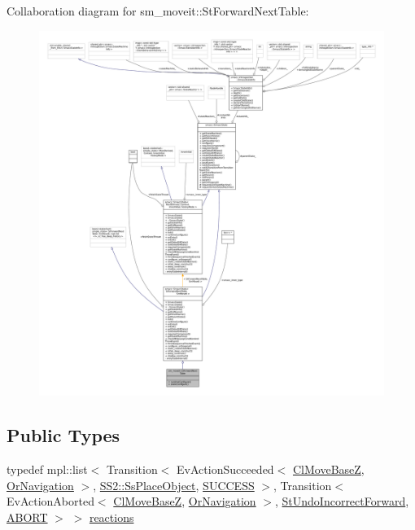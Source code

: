 Collaboration diagram for sm\+\_\+moveit\+:\+:St\+Forward\+Next\+Table\+:
\nopagebreak
\begin{figure}[H]
\begin{center}
\leavevmode
\includegraphics[width=350pt]{structsm__moveit_1_1StForwardNextTable__coll__graph}
\end{center}
\end{figure}
\subsection*{Public Types}
\begin{DoxyCompactItemize}
\item 
typedef mpl\+::list$<$ Transition$<$ Ev\+Action\+Succeeded$<$ \hyperlink{classcl__move__base__z_1_1ClMoveBaseZ}{Cl\+Move\+BaseZ}, \hyperlink{classsm__moveit_1_1OrNavigation}{Or\+Navigation} $>$, \hyperlink{structsm__moveit_1_1SS2_1_1SsPlaceObject}{S\+S2\+::\+Ss\+Place\+Object}, \hyperlink{classSUCCESS}{S\+U\+C\+C\+E\+SS} $>$, Transition$<$ Ev\+Action\+Aborted$<$ \hyperlink{classcl__move__base__z_1_1ClMoveBaseZ}{Cl\+Move\+BaseZ}, \hyperlink{classsm__moveit_1_1OrNavigation}{Or\+Navigation} $>$, \hyperlink{structsm__moveit_1_1StUndoIncorrectForward}{St\+Undo\+Incorrect\+Forward}, \hyperlink{classABORT}{A\+B\+O\+RT} $>$ $>$ \hyperlink{structsm__moveit_1_1StForwardNextTable_a00ed94e86d9c85581a167cfdf8e9dbfe}{reactions}
\end{DoxyCompactItemize}
